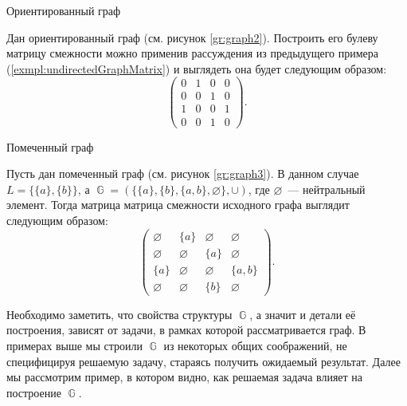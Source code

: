 \begin{marginfigure}
    \begin{center}
        \resizebox{\marginparwidth}{!}{}
    \end{center}
    \caption{Ориентированный граф}
    \label{gr:graph2}
\end{marginfigure}
\begin{example}
    \label{example:diGraph}
    Дан ориентированный граф (см. рисунок \ref{gr:graph2}).
    Построить его булеву матрицу смежности можно применив рассуждения из предыдущего примера (\ref{exmpl:undirectedGraphMatrix}) и выглядеть она будет следующим образом:
    \[
        \begin{pmatrix}
            0 & 1 & 0 & 0 \\
            0 & 0 & 1 & 0 \\
            1 & 0 & 0 & 1 \\
            0 & 0 & 1 & 0
        \end{pmatrix}.
    \]
\end{example}

\begin{marginfigure}
    \begin{center}
        \resizebox{\marginparwidth}{!}{}
    \end{center}
    \caption{Помеченный граф}
    \label{gr:graph3}
\end{marginfigure}
\begin{example}
    Пусть дан помеченный граф (см. рисунок \ref{gr:graph3}).
    В данном случае $L = \{\{a\},\{b\}\}$, а $\BbbG = ( \{\{a\},\{b\},\{a,b\},\varnothing\} ,\cup)$, где $\varnothing$~--- нейтральный элемент.
    Тогда матрица матрица смежности исходного графа выглядит следующим образом:
    \[
        \begin{pmatrix}
            \varnothing & \{a\}       & \varnothing & \varnothing \\
            \varnothing & \varnothing & \{a\}       & \varnothing \\
            \{a\}       & \varnothing & \varnothing & \{a,b\}     \\
            \varnothing & \varnothing & \{b\}       & \varnothing
        \end{pmatrix}.
    \]
\end{example}

Необходимо заметить, что свойства структуры $\BbbG$, а значит и детали её построения, зависят от задачи, в рамках которой рассматривается граф.
В примерах выше мы строили $\BbbG$ из некоторых общих соображений, не специфицируя решаемую задачу, стараясь получить ожидаемый результат.
Далее мы рассмотрим пример, в котором видно, как решаемая задача влияет на построение $\BbbG$.

